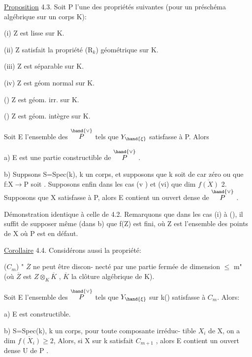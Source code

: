 
\uline{Proposition} 4.3.    Soit P l'une des propriétés  suivantes (pour un
préschéma algébrique sur un corps K):

(i)  Z  est lisse sur K.

(ii)  Z satisfait la propriété (R$_k$) géométrique sur K.

(iii)  Z est séparable sur K.

(iv)  Z est géom normal sur K.

()  Z  est géom. irr.  sur K.

()  Z est géom. intègre  sur K.

Soit E l'ensemble des \hand{$\xi \in$} $\overset{\hand{\vee}}{P}$  tels que $Y_{\hand{\xi}}$ satisfasse à P. Alors

a)  E est une partie constructible de $\overset{\hand{\vee}}{P}$ .

b)  Suppsons  S=Spec(k), k un corps, et supposons  que k soit de
car zéro  ou que f:X$\rightarrow$P  soit . Supposons enfin dans les
cas (v ) et (vi)  que dim $\overline{f(X)}$ \over{$>$}{$\geqslant$} 2.  Supposons que X satisfasse à P,
alors E contient un ouvert  dense de $\overset{\hand{\vee}}{P}$ .

Démonstration identique à celle de 4.2.   Remarquons que dans
les cas (i) à (), il suffit de supposer même (dans b) que  f(Z) est
fini, où Z est l'ensemble des points de X où  P est en défaut.

\uline{Corollaire} 4.4.    Considérons aussi la propriété:

($C_m$)   " $\overline{Z}$ ne peut être discon-%
necté par une partie fermée de dimension  $\leqslant$ m" (où $\overline{Z}$ est $Z\otimes_K\overline{K}$ , $\overline{K}$
la clôture  algébrique de K).

Soit E l'ensemble des \hand{$\xi \in$} $\overset{\hand{\vee}}{P}$  tels que  $Y_{\hand{\xi}}$ sur k(\hand{$\xi$}) satisfasse à $C_m$.
Alors:

a)  E est constructible.

b)    S=Spec(k), k un corps,   pour toute composante irréduc-%
tible  $X_i$ de X, on a dim $\overline{f(X_i)} \geqslant 2$, Alors, si X sur k satisfait $C_{m+1}$ ,
alors E\hand{$_{\unsure{\xi}}$} contient un ouvert dense U de P .

